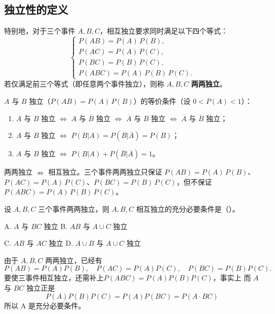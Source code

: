 \documentclass[lang=cn,11pt]{elegantbook}
\begin{document}
\subsection{独立性的定义}

特别地，对于三个事件 \(A, B, C\)，相互独立要求同时满足以下四个等式：
\[
\begin{cases}
P(AB) = P(A)\,P(B), \\
P(AC) = P(A)\,P(C), \\
P(BC) = P(B)\,P(C), \\
P(ABC) = P(A)\,P(B)\,P(C).
\end{cases}
\]
若仅满足前三个等式（即任意两个事件独立），则称 \(A, B, C\) \textbf{两两独立}。

\begin{property}\label{prop:independence-equiv}
\(A\) 与 \(B\) 独立（\(P(AB)=P(A)\,P(B)\)）的等价条件（设 \(0 < P(A) < 1\)）：
\begin{enumerate}
    \item \(A\) 与 \(B\) 独立 \(\Leftrightarrow\) \(A\) 与 \(\overline{B}\) 独立 \(\Leftrightarrow\) \(\overline{A}\) 与 \(B\) 独立 \(\Leftrightarrow\) \(\overline{A}\) 与 \(\overline{B}\) 独立；
    \item \(A\) 与 \(B\) 独立 \(\Leftrightarrow\) \(P(B|A) = P(B|\overline{A}) = P(B)\)；
    \item \(A\) 与 \(B\) 独立 \(\Leftrightarrow\) \(P(B|A) + P(\overline{B}|\overline{A}) = 1\)。
\end{enumerate}
\end{property}

\begin{note}
两两独立 \(\nRightarrow\) 相互独立。三个事件两两独立只保证 \(P(AB)=P(A)\,P(B)\)、\(P(AC)=P(A)\,P(C)\)、\(P(BC)=P(B)\,P(C)\)，但不保证 \(P(ABC)=P(A)\,P(B)\,P(C)\)。
\end{note}

\begin{exercise}\label{exer:src-2015-spring-a-ii-01}
设 \(A,B,C\) 三个事件两两独立，则 \(A,B,C\) 相互独立的充分必要条件是（\quad）。\par
A. \(A\) 与 \(BC\) 独立\quad
B. \(AB\) 与 \(A\cup C\) 独立\par
C. \(AB\) 与 \(AC\) 独立\quad
D. \(A\cup B\) 与 \(A\cup C\) 独立
\end{exercise}
\begin{solution}
由于 \(A,B,C\) 两两独立，已经有
\[
P(AB)=P(A)P(B),\quad P(AC)=P(A)P(C),\quad P(BC)=P(B)P(C).
\]
要使三事件相互独立，还需补上\(P(ABC)=P(A)P(B)P(C)\)，事实上
而 \(A\) 与 \(BC\) 独立正是
\[
P(A)P(B)P(C)=P(A)P(BC)=P(A\cdot BC)
\]
所以 A 是充分必要条件。
\end{solution}
\end{document}
